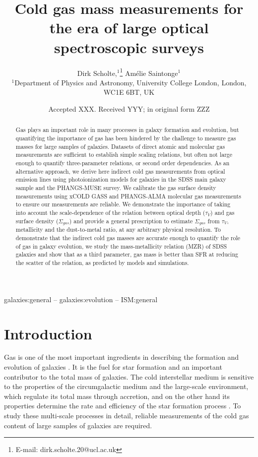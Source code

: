 \documentclass[fleqn,usenatbib]{mnras}
\title[Cold gas masses for spectroscopic surveys]{Cold gas mass measurements for the era of large optical spectroscopic surveys}
\author[D. Scholte et al.]{
Dirk Scholte,$^{1}$\thanks{E-mail: dirk.scholte.20@ucl.ac.uk}
Am\'elie Saintonge$^{1}$
\\
$^{1}$Department of Physics and Astronomy, University College London, London, WC1E 6BT, UK
}
\date{Accepted XXX. Received YYY; in original form ZZZ}
\begin{document}
\label{firstpage}
\pagerange{\pageref{firstpage}--\pageref{lastpage}}
\maketitle

\begin{abstract}
Gas plays an important role in many processes in galaxy formation and evolution, but quantifying the importance of gas has been hindered by the challenge to measure gas masses for large samples of galaxies. Datasets of direct atomic and molecular gas measurements are sufficient to establish simple scaling relations, but often not large enough to quantify three-parameter relations, or second order dependencies.  As an alternative approach, we derive here indirect cold gas measurements from optical emission lines using photoionization models for galaxies in the SDSS main galaxy sample and the PHANGS-MUSE survey. We calibrate the gas surface density measurements using xCOLD GASS and PHANGS-ALMA molecular gas measurements to ensure our measurements are reliable. We demonstrate the importance of taking into account the scale-dependence of the relation between optical depth ($\tau_V$) and gas surface density ($\Sigma_{gas}$) and provide a general prescription to estimate $\Sigma_{gas}$ from $\tau_V$, metallicity and the dust-to-metal ratio, at any arbitrary physical resolution. To demonstrate that the indirect cold gas masses are accurate enough to quantify the role of gas in galaxy evolution, we study the mass-metallicity relation (MZR) of SDSS galaxies and show that as a third parameter, gas mass is better than SFR at reducing the scatter of the relation, as predicted by models and simulations. 
\end{abstract}

\begin{keywords}
galaxies:general -- galaxies:evolution -- ISM:general
\end{keywords}



\section{Introduction}
Gas is one of the most important ingredients in describing the formation and evolution of galaxies \citep{tinsley1980}. It is the fuel for star formation and an important contributor to the total mass of galaxies. The cold interstellar medium is sensitive to the properties of the circumgalactic medium and the large-scale environment, which regulate its total mass through accretion, and on the other hand its properties determine the rate and efficiency of the star formation process \citep[e.g.][]{saintonge22}. To study these multi-scale processes in detail, reliable measurements of the cold gas content of large samples of galaxies are required.
\end{document}
